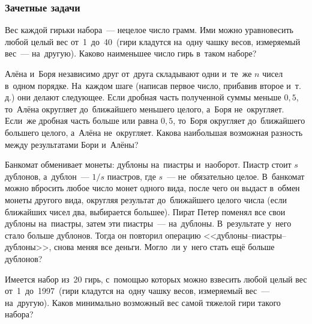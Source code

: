 \subsubsection*{Зачетные задачи}

\begin{problems}

\item
Вес каждой гирьки набора~--- нецелое число грамм.
Ими можно уравновесить любой целый вес от~1\, до~40\,
(гири кладутся на~одну чашку весов, измеряемый вес~--- на~другую).
Каково наименьшее число гирь в~таком наборе?

\item
Алёна и~Боря независимо друг от~друга складывают одни и~те~же $n$ чисел в~одном
порядке.
На~каждом шаге (написав первое число, прибавив второе и~т.\,д.) они делают
следующее.
Если дробная часть полученной суммы меньше $0{,}5$, то~Алёна округляет
до~ближайшего меньшего целого, а~Боря не~округляет.
Если~же дробная часть больше или равна $0{,}5$, то~Боря округляет до~ближайшего
большего целого, а~Алёна не~округляет.
Какова наибольшая возможная разность между результатами Бори и~Алёны?

\item
Банкомат обменивает монеты: дублоны на~пиастры и~наоборот.
Пиастр стоит $s$ дублонов, а~дублон~--- $1 / s$ пиастров, где $s$~---
не~обязательно целое.
В~банкомат можно вбросить любое число монет одного вида, после чего он выдаст
в~обмен монеты другого вида, округляя результат до~ближайшего целого числа
(если ближайших чисел два, выбирается большее).
Пират Петер поменял все свои дублоны на~пиастры, затем эти пиастры~---
на~дублоны.
В~результате у~него стало больше дублонов.
Тогда он повторил операцию <<дублоны--пиастры--дублоны>>, снова меняя все деньги.
Могло~ли у~него стать ещё больше дублонов?

Имеется набор из~20 гирь, с~помощью которых можно взвесить любой целый вес
от~1\, до~1997\,
(гири кладутся на~одну чашку весов, измеряемый вес~--- на~другую).
Каков минимально возможный вес самой тяжелой гири такого набора?

\end{problems}


